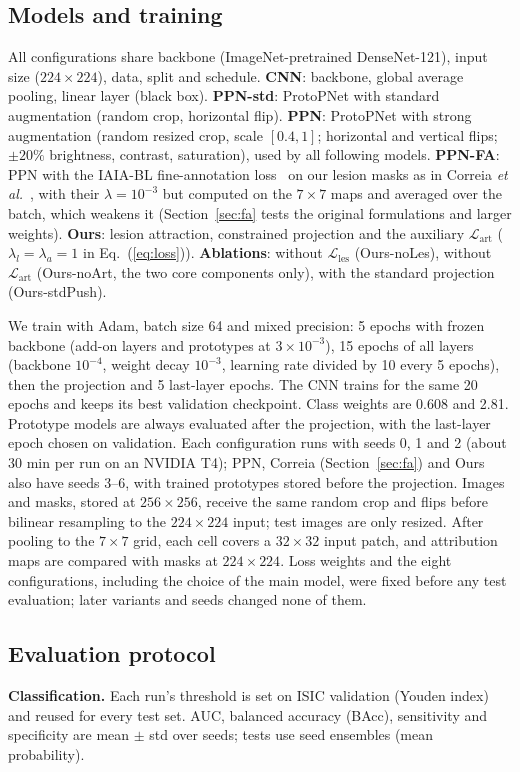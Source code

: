 \documentclass[conference]{IEEEtran}
\newcommand{\Lles}{\mathcal{L}_{\mathrm{les}}}
\newcommand{\Lart}{\mathcal{L}_{\mathrm{art}}}
\begin{document}
\subsection{Models and training}
All configurations share backbone (ImageNet-pretrained DenseNet-121), input size ($224\times224$), data, split and schedule. \textbf{CNN}: backbone, global average pooling, linear layer (black box). \textbf{PPN-std}: ProtoPNet with standard augmentation (random crop, horizontal flip). \textbf{PPN}: ProtoPNet with strong augmentation (random resized crop, scale $[0.4,1]$; horizontal and vertical flips; $\pm20\%$ brightness, contrast, saturation), used by all following models. \textbf{PPN-FA}: PPN with the IAIA-BL fine-annotation loss~\cite{barnett2021} on our lesion masks as in Correia \emph{et al.}~\cite{correia2023}, with their $\lambda=10^{-3}$ but computed on the $7\times7$ maps and averaged over the batch, which weakens it (Section~\ref{sec:fa} tests the original formulations and larger weights). \textbf{Ours}: lesion attraction, constrained projection and the auxiliary $\Lart$ ($\lambda_l=\lambda_a=1$ in Eq.~(\ref{eq:loss})). \textbf{Ablations}: without $\Lles$ (Ours-noLes), without $\Lart$ (Ours-noArt, the two core components only), with the standard projection (Ours-stdPush).

We train with Adam, batch size 64 and mixed precision: 5 epochs with frozen backbone (add-on layers and prototypes at $3\times10^{-3}$), 15 epochs of all layers (backbone $10^{-4}$, weight decay $10^{-3}$, learning rate divided by 10 every 5 epochs), then the projection and 5 last-layer epochs. The CNN trains for the same 20 epochs and keeps its best validation checkpoint. Class weights are 0.608 and 2.81. Prototype models are always evaluated after the projection, with the last-layer epoch chosen on validation. Each configuration runs with seeds 0, 1 and 2 (about 30 min per run on an NVIDIA T4); PPN, Correia (Section~\ref{sec:fa}) and Ours also have seeds 3--6, with trained prototypes stored before the projection. Images and masks, stored at $256\times256$, receive the same random crop and flips before bilinear resampling to the $224\times224$ input; test images are only resized. After pooling to the $7\times7$ grid, each cell covers a $32\times32$ input patch, and attribution maps are compared with masks at $224\times224$. Loss weights and the eight configurations, including the choice of the main model, were fixed before any test evaluation; later variants and seeds changed none of them.

\subsection{Evaluation protocol}
\label{sec:protocol}
\textbf{Classification.} Each run's threshold is set on ISIC validation (Youden index) and reused for every test set. AUC, balanced accuracy (BAcc), sensitivity and specificity are mean $\pm$ std over seeds; tests use seed ensembles (mean probability).
\end{document}
